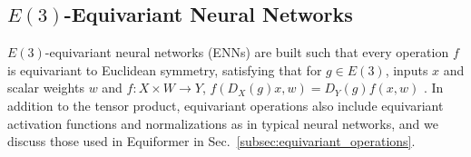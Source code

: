 \vspace{-1mm}
\subsection{$E(3)$-Equivariant Neural Networks}
\vspace{-1mm}

$E(3)$-equivariant neural networks (ENNs) are built such that every operation $f$ is equivariant to Euclidean symmetry, satisfying that for $g \in E(3)$, inputs $x$ and scalar weights $w$ and $f:X \times W \rightarrow Y$, $f(D_X(g)x, w) = D_Y(g)f(x, w)$ \cite{tfn,kondor2018clebsch,3dsteerable}.
In addition to the tensor product, equivariant operations also include equivariant activation functions and normalizations as in typical neural networks, and we discuss those used in Equiformer in Sec.~\ref{subsec:equivariant_operations}.







